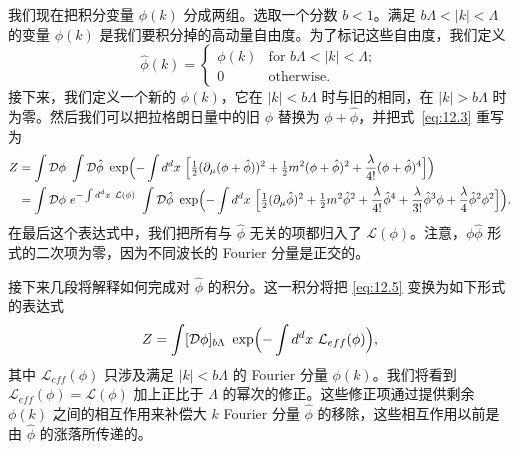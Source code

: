我们现在把积分变量 $\phi(k)$ 分成两组。选取一个分数 $b < 1$。满足 $b\Lambda < |k| < \Lambda$ 的变量 $\phi(k)$ 是我们要积分掉的高动量自由度。为了标记这些自由度，我们定义
\begin{equation}
  \hat{\phi}(k) = \begin{cases}
    \phi(k) & \text{for } b\Lambda < |k| < \Lambda;\\
    0 & \text{otherwise}.
  \end{cases}
\end{equation}
接下来，我们定义一个新的 $\phi(k)$，它在 $|k| < b\Lambda$ 时与旧的相同，在 $|k| > b\Lambda$ 时为零。然后我们可以把拉格朗日量中的旧 $\phi$ 替换为 $\phi + \hat{\phi}$，并把式~\eqref{eq:12.3} 重写为
\begin{equation}
  \begin{aligned}
    Z &= \int \mathcal{D}\phi\ \int \mathcal{D}\hat{\phi}\ \exp\Bigl(
      -\int d^dx\ \Bigl[ \tfrac{1}{2}(\partial_\mu(\phi+\hat{\phi}))^2
        + \tfrac{1}{2}m^2(\phi+\hat{\phi})^2 + \frac{\lambda}{4!}
          (\phi+\hat{\phi})^4 \Bigr] \Bigr)\\
    &= \int \mathcal{D}\phi\ e^{-\int d^dx\ \mathcal{L}(\phi)}\ \int
      \mathcal{D}\hat{\phi}\ \exp\Bigl( -\int d^dx\ \Bigl[
        \tfrac{1}{2}(\partial_\mu\hat{\phi})^2 + \tfrac{1}{2}m^2\hat{\phi}^2
        + \frac{\lambda}{4!}\hat{\phi}^4 + \frac{\lambda}{3!}\hat{\phi}^3\phi
        + \frac{\lambda}{4}\hat{\phi}^2\phi^2 \Bigr] \Bigr) .
  \end{aligned}
  \label{eq:12.5}
\end{equation}
在最后这个表达式中，我们把所有与 $\hat{\phi}$ 无关的项都归入了 $\mathcal{L}(\phi)$。注意，$\phi\hat{\phi}$ 形式的二次项为零，因为不同波长的 Fourier 分量是正交的。

接下来几段将解释如何完成对 $\hat{\phi}$ 的积分。这一积分将把 \eqref{eq:12.5} 变换为如下形式的表达式
\begin{equation}
  Z = \int [\mathcal{D}\phi]_{b\Lambda}\ \exp\Bigl( -\int d^dx\
    \mathcal{L}_{eff}(\phi) \Bigr) ,
  \label{eq:12.6}
\end{equation}
其中 $\mathcal{L}_{eff}(\phi)$ 只涉及满足 $|k| < b\Lambda$ 的 Fourier 分量 $\phi(k)$。我们将看到 $\mathcal{L}_{eff}(\phi) = \mathcal{L}(\phi)$ 加上正比于 $\Lambda$ 的幂次的修正。这些修正项通过提供剩余 $\phi(k)$ 之间的相互作用来补偿大 $k$ Fourier 分量 $\hat{\phi}$ 的移除，这些相互作用以前是由 $\hat{\phi}$ 的涨落所传递的。

